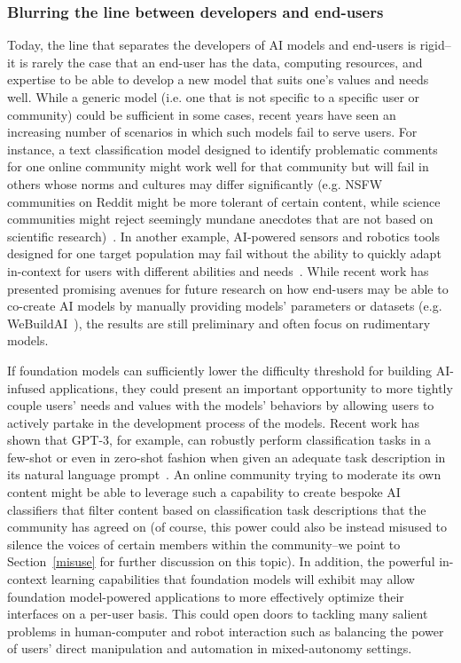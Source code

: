 \subsubsection{Blurring the line between developers and end-users}
\label{sec:interaction-blurring}
Today, the line that separates the developers of AI models and end-users is rigid--it is rarely the case that an end-user has the data, computing resources, and expertise to be able to develop a new model that suits one's values and needs well. While a generic model (i.e. one that is not specific to a specific user or community) could be sufficient in some cases, recent years have seen an increasing number of scenarios in which such models fail to serve users. For instance, a text classification model designed to identify problematic comments for one online community might work well for that community but will fail in others whose norms and cultures may differ significantly (e.g. NSFW communities on Reddit might be more tolerant of certain content, while science communities might reject seemingly mundane anecdotes that are not based on scientific research)~\citep{Chandrasekharan2018internet}. In another example, AI-powered sensors and robotics tools designed for one target population may fail without the ability to quickly adapt in-context for users with different abilities and needs~\citep{Karamcheti2021latent}. While recent work has presented promising avenues for future research on how end-users may be able to co-create AI models by manually providing models' parameters or datasets (e.g. WeBuildAI~\citep{Lee2019}), the results are still preliminary and often focus on rudimentary models. 

If foundation models can sufficiently lower the difficulty threshold for building AI-infused applications, they could present an important opportunity to more tightly couple users' needs and values with the models' behaviors by allowing users to actively partake in the development process of the models. Recent work has shown that GPT-3, for example, can robustly perform classification tasks in a few-shot or even in zero-shot fashion when given an adequate task description in its natural language prompt~\citep{brown2020gpt3}. An online community trying to moderate its own content might be able to leverage such a capability to create bespoke AI classifiers that filter content based on classification task descriptions that the community has agreed on (of course, this power could also be instead misused to silence the voices of certain members within the community--we point to Section~\ref{misuse} for further discussion on this topic). In addition, the powerful in-context learning capabilities that foundation models will exhibit may allow foundation model-powered applications to more effectively optimize their interfaces on a per-user basis. This could open doors to tackling many salient problems in human-computer and robot interaction such as balancing the power of users' direct manipulation and automation in mixed-autonomy settings. 

